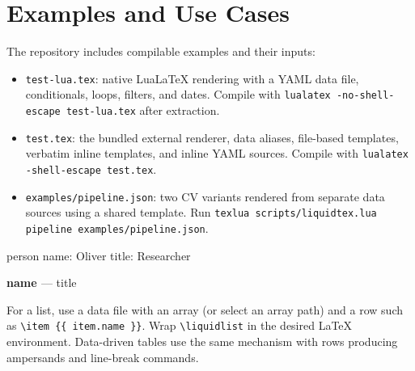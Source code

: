 \section{Examples and Use Cases}
\label{app:examples}

The repository includes compilable examples and their inputs:
\begin{itemize}
\item \texttt{test-lua.tex}: native LuaLaTeX rendering with a YAML data file,
  conditionals, loops, filters, and dates. Compile with
  \texttt{lualatex -no-shell-escape test-lua.tex} after extraction.
\item \texttt{test.tex}: the bundled external renderer, data aliases, file-based
  templates, verbatim inline templates, and inline YAML sources. Compile with
  \texttt{lualatex -shell-escape test.tex}.
\item \texttt{examples/pipeline.json}: two CV variants rendered from separate
  data sources using a shared template. Run
  \texttt{texlua scripts/liquidtex.lua pipeline examples/pipeline.json}.
\end{itemize}

\begin{bodycode}
\begin{liquiddata}{person}
name: Oliver
title: Researcher
\end{liquiddata}
\begin{liquid}[person]
\textbf{ {{ name }} } --- {{ title }}
\end{liquid}
\end{bodycode}

For a list, use a data file with an array (or select an array path) and a row
such as \verb|\item {{ item.name }}|. Wrap \verb|\liquidlist| in the desired LaTeX
environment. Data-driven tables use the same mechanism with rows producing
ampersands and line-break commands.
